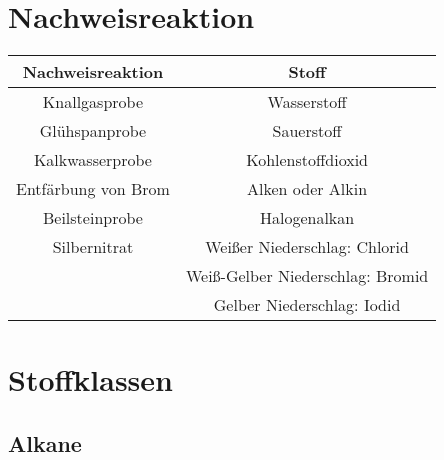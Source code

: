 \documentclass[a4paper]{article}
\begin{document}
\section{Nachweisreaktion}
\begin{center}
    \begin{tabular}{|c | c|} \hline
        \textbf{Nachweisreaktion} & \textbf{Stoff} \\ \hline
        Knallgasprobe &Wasserstoff \\
        Glühspanprobe &Sauerstoff \\
        Kalkwasserprobe &Kohlenstoffdioxid \\
        Entfärbung von Brom &Alken oder Alkin \\
        Beilsteinprobe & Halogenalkan \\ \hline
        Silbernitrat & Weißer Niederschlag: Chlorid \\
        \quad & Weiß-Gelber Niederschlag: Bromid \\
        \quad & Gelber Niederschlag: Iodid \\ \hline
    \end{tabular}
\end{center}



\section{Stoffklassen}
\subsection{Alkane}
\end{document}
